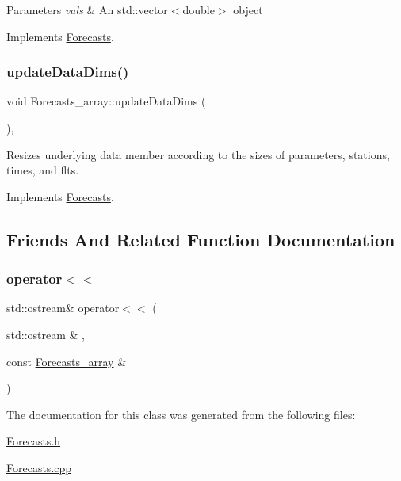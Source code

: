 \begin{DoxyParams}{Parameters}
{\em vals} & An std\+::vector$<$double$>$ object \\
\hline
\end{DoxyParams}


Implements \mbox{\hyperlink{class_forecasts_ae2a59385e03dd372fef3dfe89f5a31cf}{Forecasts}}.

\mbox{\label{class_forecasts__array_ab3fc780bb6a5cbf132457c8c336bc777}} 
\subsubsection{\texorpdfstring{update\+Data\+Dims()}{updateDataDims()}}
{\footnotesize\ttfamily void Forecasts\+\_\+array\+::update\+Data\+Dims (\begin{DoxyParamCaption}{ }\end{DoxyParamCaption})\hspace{0.3cm}{\ttfamily [override]}, {\ttfamily [virtual]}}

Resizes underlying data member according to the sizes of parameters, stations, times, and flts. 

Implements \mbox{\hyperlink{class_forecasts_a8c7d29af8edb5c3bc6a6aad2220506a9}{Forecasts}}.



\subsection{Friends And Related Function Documentation}
\mbox{\label{class_forecasts__array_a6bde933a6e00ad1328f834e4f5d98606}} 
\subsubsection{\texorpdfstring{operator$<$$<$}{operator<<}}
{\footnotesize\ttfamily std\+::ostream\& operator$<$$<$ (\begin{DoxyParamCaption}\item[{std\+::ostream \&}]{,  }\item[{const \mbox{\hyperlink{class_forecasts__array}{Forecasts\+\_\+array}} \&}]{ }\end{DoxyParamCaption})\hspace{0.3cm}{\ttfamily [friend]}}



The documentation for this class was generated from the following files\+:\begin{DoxyCompactItemize}
\item 
\mbox{\hyperlink{_forecasts_8h}{Forecasts.\+h}}\item 
\mbox{\hyperlink{_forecasts_8cpp}{Forecasts.\+cpp}}\end{DoxyCompactItemize}
